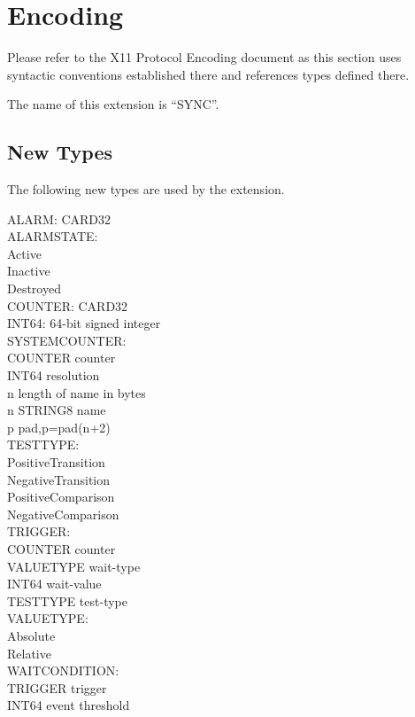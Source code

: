 \section{Encoding}

Please refer to the X11 Protocol Encoding document as this section uses
syntactic conventions established there and references types defined there.

The name of this extension is ``SYNC''.

\subsection{New Types}

The following new types are used by the extension.

\begin{tabbing}
\tabstopsC
ALARM: CARD32\\
ALARMSTATE:\\
\tabstopsB
		\> Active \\
		\> Inactive \\
		\> Destroyed\\
\tabstopsC
COUNTER: CARD32\\
INT64: 64-bit signed integer\\
SYSTEMCOUNTER:\\
		\> COUNTER	\> counter \\
		\> INT64	\> resolution\\
		\> n		\> length of name in bytes\\
	\> n	\> STRING8	\> name \\
	\> p	\> 		\> pad,p=pad(n+2)\\
TESTTYPE:\\
\tabstopsB
		\> PositiveTransition \\
		\> NegativeTransition \\
		\> PositiveComparison \\
		\> NegativeComparison \\
\tabstopsC
TRIGGER:\\
		\> COUNTER	\> counter \\
		\> VALUETYPE	\> wait-type \\	
		\> INT64	\> wait-value \\
		\> TESTTYPE	\> test-type \\
VALUETYPE:\\
\tabstopsB
		\> Absolute \\
		\> Relative \\
\tabstopsC
WAITCONDITION:\\
		\> TRIGGER	\> trigger \\
		\> INT64	\> event threshold\\
\end{tabbing}

